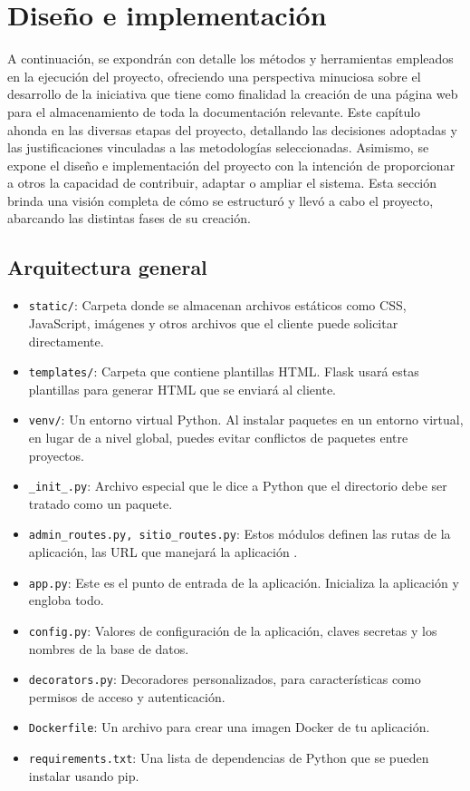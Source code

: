 \documentclass[a4paper, 12pt]{book}
\begin{document}
\cleardoublepage
\chapter{Diseño e implementación}
\label{sec:diseno}

A continuación, se expondrán con detalle los métodos y herramientas empleados en la ejecución del proyecto, ofreciendo una perspectiva minuciosa sobre el desarrollo 
de la iniciativa que tiene como finalidad la creación de una página web para el almacenamiento de toda la documentación relevante. Este capítulo ahonda en las diversas 
etapas del proyecto, detallando las decisiones adoptadas y las justificaciones vinculadas a las metodologías seleccionadas. 
Asimismo, se expone el diseño e implementación del proyecto con la intención de proporcionar a otros la capacidad de contribuir, adaptar o ampliar el sistema. 
Esta sección brinda una visión completa de cómo se estructuró y llevó a cabo el proyecto, abarcando las distintas fases de su creación.


\section{Arquitectura general} 
\label{sec:arquitectura}


\begin{itemize}
  \item \texttt{static/}: Carpeta donde se almacenan archivos estáticos como CSS, JavaScript, imágenes y otros archivos que el cliente puede solicitar directamente.
  \item \texttt{templates/}: Carpeta que contiene plantillas HTML. Flask usará estas plantillas para generar HTML que se enviará al cliente.
  \item \texttt{venv/}: Un entorno virtual Python. Al instalar paquetes en un entorno virtual, en lugar de a nivel global, puedes evitar conflictos de paquetes entre proyectos.
  \item \texttt{\_init\_.py}: Archivo especial que le dice a Python que el directorio debe ser tratado como un paquete.
  \item \texttt{admin\_routes.py, sitio\_routes.py}: Estos módulos definen las rutas de la aplicación, las URL que manejará la aplicación .
  \item \texttt{app.py}: Este es el punto de entrada de la aplicación. Inicializa la aplicación y engloba todo.
  \item \texttt{config.py}: Valores de configuración de la aplicación, claves secretas y los nombres de la base de datos.
  \item \texttt{decorators.py}: Decoradores personalizados, para características como permisos de acceso y autenticación.
  \item \texttt{Dockerfile}: Un archivo para crear una imagen Docker de tu aplicación.
  \item \texttt{requirements.txt}: Una lista de dependencias de Python que se pueden instalar usando pip.
\end{itemize}
\end{document}

